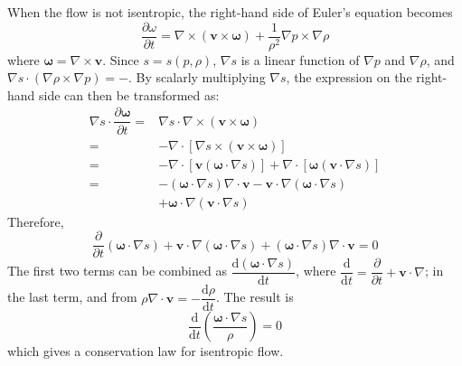 \documentclass[conference]{IEEEtran}
\theoremstyle{definition}
\theoremstyle{remark}
\begin{document}
    When the flow is not isentropic, the right-hand side of Euler's equation becomes
    \[
        \dfrac{\partial \omega}{\partial t} = \nabla \times (\mathbf{v} \times \boldsymbol{\omega}) + \dfrac1{\rho^2} \nabla p \times \nabla \rho
    \]
    where $\boldsymbol{\omega} = \nabla \times \mathbf{v}$. Since $s = s(p, \rho)$, $\nabla s$ is a linear function of $\nabla p$ and $\nabla \rho$, and $\nabla s \cdot (\nabla \rho \times \nabla p) = -$. By scalarly multiplying $\nabla s$, the expression on the right-hand side can then be transformed as:
    \begin{align*}
        \nabla s \cdot \dfrac{\partial \boldsymbol{\omega}}{\partial t} =& \nabla s \cdot \nabla \times (\mathbf{v} \times \boldsymbol{\omega}) \\
        =& -\nabla \cdot [\nabla s \times (\mathbf{v} \times \boldsymbol{\omega})] \\
        =& -\nabla \cdot [\mathbf{v} (\boldsymbol{\omega} \cdot \nabla s)] + \nabla \cdot [\boldsymbol{\omega} (\mathbf{v} \cdot \nabla s)] \\
        =& - (\boldsymbol{\omega} \cdot \nabla s) \nabla \cdot \mathbf{v} - \mathbf{v} \cdot \nabla (\boldsymbol{\omega} \cdot \nabla s) \\
        &+ \boldsymbol{\omega} \cdot \nabla (\mathbf{v} \cdot \nabla s)
    \end{align*}
    Therefore,
    \[
        \dfrac{\partial}{\partial t} (\boldsymbol{\omega} \cdot \nabla s) + \mathbf{v} \cdot \nabla (\boldsymbol{\omega} \cdot \nabla s) + (\boldsymbol{\omega} \cdot \nabla s) \nabla \cdot \mathbf{v} = 0
    \]
    The first two terms can be combined as $\dfrac{\mathrm{d} (\boldsymbol{\omega} \cdot \nabla s)}{\mathrm{d} t}$, where $\dfrac{\mathrm{d}}{\mathrm{d} t} = \dfrac{\partial}{\partial t} + \mathbf{v} \cdot \nabla$; in the last term, and from $\rho \nabla \cdot \mathbf{v} = - \dfrac{\mathrm{d} \rho}{\mathrm{d} t}$. The result is
    \[
        \dfrac{\mathrm{d}}{\mathrm{d} t} \left( \dfrac{\boldsymbol{\omega} \cdot \nabla s}{\rho} \right) = 0
    \]
    which gives a conservation law for isentropic flow.
    
\end{document}

